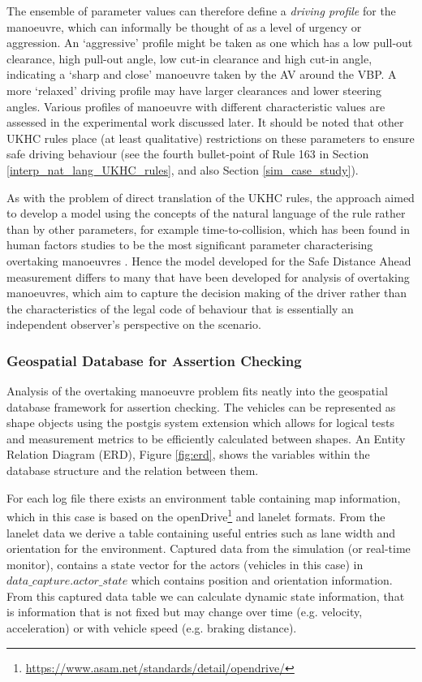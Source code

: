 The ensemble of parameter values can therefore define a \emph{driving profile} for the manoeuvre, which can informally be thought of as a level of urgency or aggression. An `aggressive' profile might be taken as one which has a low pull-out clearance, high pull-out angle, low cut-in clearance and high cut-in angle, indicating a `sharp and close' manoeuvre taken by the AV around the VBP. A more `relaxed' driving profile may have larger clearances and lower steering angles. Various profiles of manoeuvre with different characteristic values are assessed in the experimental work discussed later. It should be noted that other UKHC rules place (at least qualitative) restrictions on these parameters to ensure safe driving behaviour (see the fourth bullet-point of Rule 163 in Section \ref{interp_nat_lang_UKHC_rules}, and also Section \ref{sim_case_study}). 

As with the problem of direct translation of the UKHC rules, the approach aimed to develop a model using the concepts of the natural language of the rule rather than by other parameters, for example time-to-collision, which has been found in human factors studies to be the most significant parameter characterising overtaking manoeuvres \cite{lenard2018, Chen2015}. Hence the model developed for the Safe Distance Ahead measurement differs to many that have been developed for analysis of overtaking manoeuvres, which aim to capture the decision making of the driver rather than the characteristics of the legal code of behaviour that is essentially an independent observer's perspective on the scenario.

\subsubsection{Geospatial Database for Assertion Checking}
Analysis of the overtaking manoeuvre problem fits neatly into the geospatial database framework for assertion checking. The vehicles can be represented as shape objects using the postgis system extension which allows for logical tests and measurement metrics to be efficiently calculated between shapes. An Entity Relation Diagram (ERD), Figure \ref{fig:erd}, shows the variables within the database structure and the relation between them. 

For each log file there exists an environment table containing map information, which in this case is based on the openDrive\footnote{\url{https://www.asam.net/standards/detail/opendrive/}} and lanelet formats. From the lanelet data we derive a table containing useful entries such as lane width and orientation for the environment. Captured data from the simulation (or real-time monitor), contains a state vector for the actors (vehicles in this case) in $data\_capture.actor\_state$ which contains position and orientation information. From this captured data table we can calculate dynamic state information, that is information that is not fixed but may change over time (e.g. velocity, acceleration) or with vehicle speed (e.g. braking distance). 

